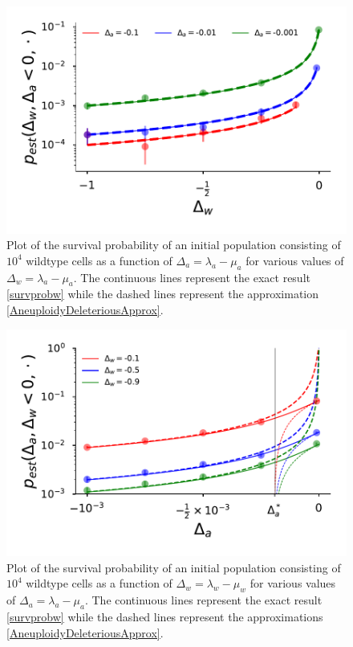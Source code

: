 \documentclass[12pt]{extarticle}
\begin{document}
\begin{figure}[!t]
 \vspace*{1\baselineskip}
\includegraphics[width=1\textwidth]{Figures/P_est.pdf}
\caption{Plot of the survival probability of an initial population consisting of $10^{4}$ wildtype cells as a function of $\Delta_a=\lambda_a-\mu_a$ for various values of $\Delta_w=\lambda_a-\mu_a$. The continuous lines represent the exact result \eqref{survprobw} while the dashed lines represent the approximation \eqref{AneuploidyDeleteriousApprox}.}
\label{P_est}
\end{figure}

\begin{figure}[!t]
 \vspace*{1\baselineskip}
\includegraphics[width=1\textwidth]{Figures/P_est_divergence.pdf}
\caption{Plot of the survival probability of an initial population consisting of $10^{4}$ wildtype cells as a function of $\Delta_w=\lambda_w-\mu_w$ for various values of $\Delta_a=\lambda_a-\mu_a$. The continuous lines represent the exact result \eqref{survprobw} while the dashed lines represent the approximations \eqref{AneuploidyDeleteriousApprox}.}
\label{P_est}
\end{figure}
\end{document}
